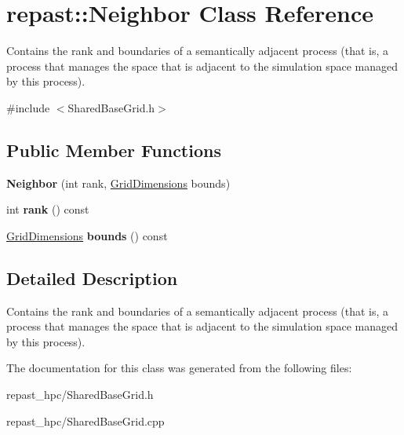\hypertarget{classrepast_1_1_neighbor}{\section{repast\-:\-:Neighbor Class Reference}
\label{classrepast_1_1_neighbor}
}


Contains the rank and boundaries of a semantically adjacent process (that is, a process that manages the space that is adjacent to the simulation space managed by this process).  




{\ttfamily \#include $<$Shared\-Base\-Grid.\-h$>$}

\subsection*{Public Member Functions}
\begin{DoxyCompactItemize}
\item 
\hypertarget{classrepast_1_1_neighbor_a7063a662d4342a523b2716ae9100da67}{{\bfseries Neighbor} (int rank, \hyperlink{classrepast_1_1_grid_dimensions}{Grid\-Dimensions} bounds)}\label{classrepast_1_1_neighbor_a7063a662d4342a523b2716ae9100da67}

\item 
\hypertarget{classrepast_1_1_neighbor_a09114073766153e1a5e596fd0eba0734}{int {\bfseries rank} () const }\label{classrepast_1_1_neighbor_a09114073766153e1a5e596fd0eba0734}

\item 
\hypertarget{classrepast_1_1_neighbor_ab49a3e501a9a6765bde278c48fe41ae0}{\hyperlink{classrepast_1_1_grid_dimensions}{Grid\-Dimensions} {\bfseries bounds} () const }\label{classrepast_1_1_neighbor_ab49a3e501a9a6765bde278c48fe41ae0}

\end{DoxyCompactItemize}


\subsection{Detailed Description}
Contains the rank and boundaries of a semantically adjacent process (that is, a process that manages the space that is adjacent to the simulation space managed by this process). 

The documentation for this class was generated from the following files\-:\begin{DoxyCompactItemize}
\item 
repast\-\_\-hpc/Shared\-Base\-Grid.\-h\item 
repast\-\_\-hpc/Shared\-Base\-Grid.\-cpp\end{DoxyCompactItemize}
